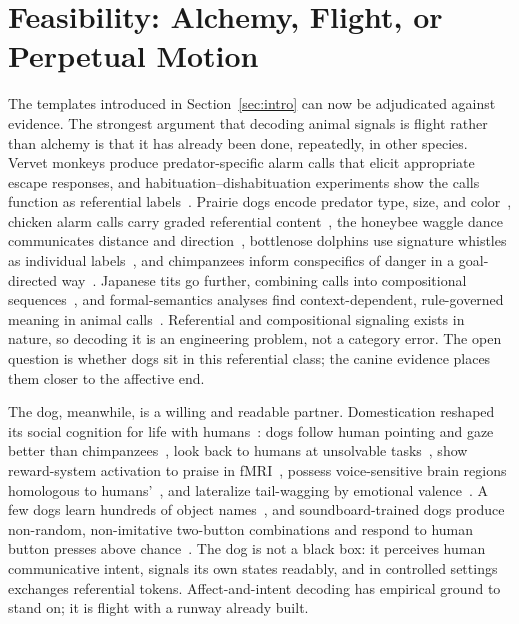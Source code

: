 \section{Feasibility: Alchemy, Flight, or Perpetual Motion}
\label{sec:feasibility}

The templates introduced in Section~\ref{sec:intro} can now be adjudicated
against evidence. The strongest argument that decoding animal signals is
flight rather than alchemy is that it has already been done, repeatedly, in
other species. Vervet monkeys produce predator-specific alarm calls that
elicit appropriate escape responses, and habituation--dishabituation
experiments show the calls function as referential
labels~\cite{seyfarth1980vervet,cheney1990monkeys}. Prairie dogs encode
predator type, size, and color~\cite{slobodchikoff2009prairie}, chicken alarm
calls carry graded referential content~\cite{evans1993alarm}, the honeybee
waggle dance communicates distance and direction~\cite{vonfrisch1967dance},
bottlenose dolphins use signature whistles as individual
labels~\cite{janik1998whistles,king2013labels}, and chimpanzees inform
conspecifics of danger in a goal-directed way~\cite{crockford2012inform}.
Japanese tits go further, combining calls into compositional
sequences~\cite{suzuki2016compositional}, and formal-semantics analyses find
context-dependent, rule-governed meaning in animal
calls~\cite{schlenker2016formal}. Referential and compositional signaling
exists in nature, so decoding it is an engineering problem, not a category
error. The open question is whether dogs sit in this referential class; the
canine evidence places them closer to the affective end.

The dog, meanwhile, is a willing and readable partner. Domestication
reshaped its social cognition for life with
humans~\cite{hare2002domestication,frantz2016genomic}: dogs follow human
pointing and gaze better than chimpanzees~\cite{soproni2001comprehension},
look back to humans at unsolvable tasks~\cite{miklosi2003lookback}, show
reward-system activation to praise in fMRI~\cite{berns2012fmri}, possess
voice-sensitive brain regions homologous to
humans'~\cite{andics2014voice}, and lateralize tail-wagging by emotional
valence~\cite{quaranta2007tail}. A few dogs learn hundreds of object
names~\cite{kaminski2004rico,pilley2011chaser}, and soundboard-trained dogs
produce non-random, non-imitative two-button combinations and respond to
human button presses above
chance~\cite{bastos2024plos,bastos2024scirep,bastos2023interact}. The dog is
not a black box: it perceives human communicative intent, signals its own
states readably, and in controlled settings exchanges referential tokens.
Affect-and-intent decoding has empirical ground to stand on; it is flight
with a runway already built.

